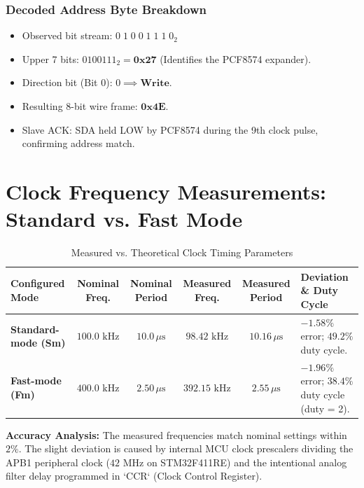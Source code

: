 \documentclass[11pt,a4paper]{article}
\begin{document}
\subsubsection*{Decoded Address Byte Breakdown}
\begin{itemize}
    \item Observed bit stream: $0\;1\;0\;0\;1\;1\;1\;0_2$
    \item Upper 7 bits: $0100111_2 = \mathbf{0x27}$ (Identifies the PCF8574 expander).
    \item Direction bit (Bit 0): $0 \implies \mathbf{Write}$.
    \item Resulting 8-bit wire frame: $\mathbf{0x4E}$.
    \item Slave ACK: SDA held LOW by PCF8574 during the 9th clock pulse, confirming address match.
\end{itemize}

\section{Clock Frequency Measurements: Standard vs. Fast Mode}

\begin{table}[h!]
\centering
\small
\caption{Measured vs. Theoretical Clock Timing Parameters}
\vspace{4pt}
\begin{tabularx}{\textwidth}{l c c c c X}
\toprule
\textbf{Configured Mode} & \textbf{Nominal Freq.} & \textbf{Nominal Period} & \textbf{Measured Freq.} & \textbf{Measured Period} & \textbf{Deviation \& Duty Cycle} \\
\midrule
\textbf{Standard-mode (Sm)} & $100.0\text{ kHz}$ & $10.0\,\mu\text{s}$ & $98.42\text{ kHz}$ & $10.16\,\mu\text{s}$ & $-1.58\%$ error; $49.2\%$ duty cycle. \\
\textbf{Fast-mode (Fm)} & $400.0\text{ kHz}$ & $2.50\,\mu\text{s}$ & $392.15\text{ kHz}$ & $2.55\,\mu\text{s}$ & $-1.96\%$ error; $38.4\%$ duty cycle (duty = 2). \\
\bottomrule
\end{tabularx}
\end{table}

\textbf{Accuracy Analysis:} The measured frequencies match nominal settings within $2\%$. The slight deviation is caused by internal MCU clock prescalers dividing the APB1 peripheral clock ($42\text{ MHz}$ on STM32F411RE) and the intentional analog filter delay programmed in `CCR` (Clock Control Register).
\end{document}
